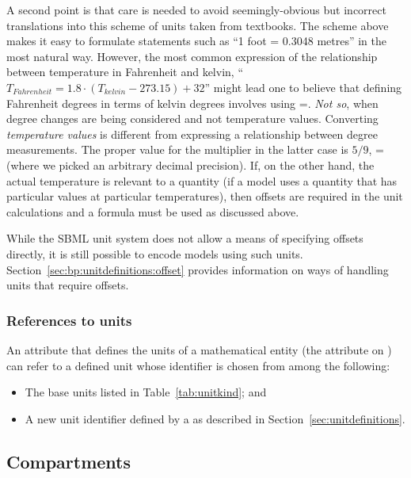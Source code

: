 A second point is that care is needed to avoid seemingly-obvious
but incorrect translations into this scheme of units taken from
textbooks.  The scheme above makes it easy to formulate statements
such as ``1 foot = 0.3048 metres'' in the most natural way.
However, the most common expression of the relationship between
temperature in Fahrenheit and kelvin, ``$T_{Fahrenheit} = 1.8
\cdot (T_{kelvin} - 273.15) + 32$'' might lead one to believe that
defining Fahrenheit degrees in terms of kelvin degrees involves
using =.  \emph{Not so}, when degree
changes are being considered and not temperature values.
Converting \emph{temperature values} is different from expressing
a relationship between degree measurements.  The proper value for
the multiplier in the latter case is $5/9$, \ie
{}= (where we picked an arbitrary
decimal precision).  If, on the other hand, the actual temperature
is relevant to a quantity (\eg if a model uses a quantity that has
particular values at particular temperatures), then offsets are
required in the unit calculations and a formula must be used as
discussed above.

While the SBML unit system does not allow a means of specifying
offsets directly, it is still possible to encode models using such
units.  Section~\ref{sec:bp:unitdefinitions:offset} provides 
information on ways of handling units that require offsets.


\subsubsection{References to units}

An attribute that defines the units of a mathematical entity (\eg the
attribute  on \Parameter) can refer to a defined unit
whose identifier is chosen from among the following:
\begin{itemize}
  
\item The base units listed in Table~\vref{tab:unitkind}; and

\item A new unit identifier defined by a \UnitDefinition as
  described in Section~\ref{sec:unitdefinitions}.

\end{itemize}


\subsection{Compartments}
\label{sec:compartments}

